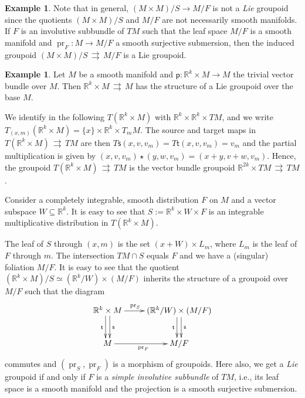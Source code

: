 \documentclass{amsart}
\theoremstyle{definition}
\newtheorem{example}[theorem]{Example}
\begin{document}
\begin{example}
\medskip

Note that in general, $(M\times M)/S\to M/F$ 
is not a \emph{Lie} groupoid since the quotients 
$(M\times M)/S$ and $M/F$ are not necessarily smooth manifolds. 
 If $F$ is an involutive subbundle of $TM$ such that the leaf space
$M/F$ is  a smooth manifold and $\operatorname{pr}_F:M\to M/F$ a
smooth surjective submersion, then the induced groupoid $(M\times M)/S\,{{\rightrightarrows}}\,
M/F$ is a Lie groupoid.
\end{example}

\begin{example}\label{ex-VB}
Let $M$ be a smooth manifold and $\mathsf p:{\mathbb{R}}^k\times M\to M$ the trivial
vector bundle over $M$. Then ${\mathbb{R}}^k\times M\,{{\rightrightarrows}}\, M$ has the structure 
of a Lie groupoid over the base $M$.

We identify in the following $T({\mathbb{R}}^k\times M)$ with ${\mathbb{R}}^k\times {\mathbb{R}}^k\times
TM$, and we write $T_{(x,m)} ({\mathbb{R}}^k\times M)=\{x\}\times{\mathbb{R}}^k\times T_mM$.
The source and target maps in $T({\mathbb{R}}^k\times M)\,{{\rightrightarrows}}\, TM$ are then
$T{{\mathsf{s}}}(x,v,v_m)=T{{\mathsf{t}}}(x,v,v_m)=v_m$ and
the partial multiplication is given by
$(x,v,v_m)\star(y,w,v_m)=(x+y,v+w,v_m)$. Hence, the groupoid $T({\mathbb{R}}^k\times
M)\,{{\rightrightarrows}}\, TM$ is the vector bundle groupoid ${\mathbb{R}}^{2k}\times TM\,{{\rightrightarrows}} \,TM$.

Consider a completely integrable, smooth distribution $F$ on $M$
and a vector subspace $W\subseteq {\mathbb{R}}^k$. It is easy to see that 
$S:={\mathbb{R}}^k\times W\times F$ is an integrable multiplicative
 distribution in $T({\mathbb{R}}^k\times M)$.

The leaf of $S$ through $(x,m)$ is the set $(x+W)\times L_m$, 
where $L_m$ is the leaf of $F$ through $m$. The intersection
$TM\cap S$ equals $F$ and we have a (singular) foliation $M/F$.
It is easy to see
 that the quotient $({\mathbb{R}}^k\times M)/S\simeq ({\mathbb{R}}^k/W)\times(M/F)$ inherits the structure of 
 a groupoid over $M/F$
such that the diagram
\begin{displaymath}
\begin{xy}
\xymatrix{
{\mathbb{R}}^k\times M\ar@<.6ex>[d]^{{\mathsf{s}}}\ar@<-.6ex>[d]_{{\mathsf{t}}}\ar[r]^{\operatorname{pr}_S\qquad}
& ({\mathbb{R}}^k/W)\times(M/F)\ar@<.6ex>[d]^{{\mathsf{s}}}\ar@<-.6ex>[d]_{{\mathsf{t}}}\\
M \ar[r]_{\operatorname{pr}_F}& M/F
}
\end{xy}
\end{displaymath}
commutes and $(\operatorname{pr}_S,\operatorname{pr}_F)$ is a morphism of groupoids.
Here also, we get a \emph{Lie} groupoid if and only if 
$F$ is a \emph{simple involutive subbundle} of $TM$, i.e.,
its leaf space is a smooth manifold and the projection is a smooth surjective submersion. 
\end{example}
\end{document}
